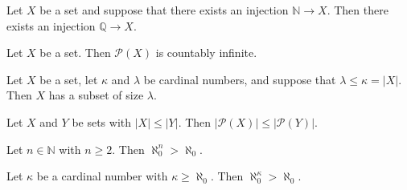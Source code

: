 
\begin{chapex} %
\label{cqInfinityASNBegin}
Let $X$ be a set and suppose that there exists an injection $\mathbb{N} \to X$. Then there exists an injection $\mathbb{Q} \to X$.
\end{chapex}

\begin{chapex} %
Let $X$ be a set. Then $\mathcal{P}(X)$ is countably infinite.
\end{chapex}

\begin{chapex} %
Let $X$ be a set, let $\kappa$ and $\lambda$ be cardinal numbers, and suppose that $\lambda \le \kappa = |X|$. Then $X$ has a subset of size $\lambda$.
\end{chapex}

\begin{chapex} %
Let $X$ and $Y$ be sets with $|X| \le |Y|$. Then $|\mathcal{P}(X)| \le |\mathcal{P}(Y)|$.
\end{chapex}

\begin{chapex} %
Let $n \in \mathbb{N}$ with $n \ge 2$. Then $\aleph_0^n > \aleph_0$.
\end{chapex}

\begin{chapex} %
\label{cqInfinityASNEnd}
Let $\kappa$ be a cardinal number with $\kappa \ge \aleph_0$. Then $\aleph_0^{\kappa} > \aleph_0$.
\end{chapex}
